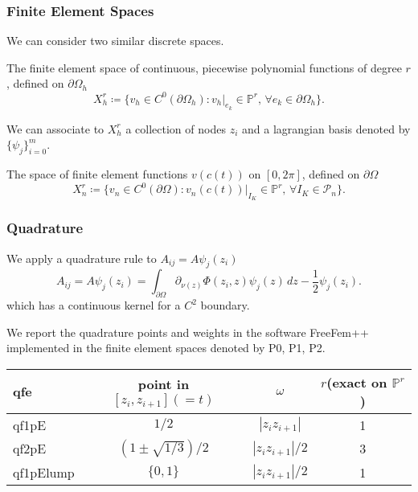 \documentclass[handout]{beamer}
\begin{document}
\begin{frame}
\frametitle{Finite Element Spaces}
We can consider two similar discrete spaces.
\begin{definition}
The finite element space of continuous, piecewise polynomial functions of degree $r$, 
defined on {\color{blue}$\partial\Omega_h$}
\begin{equation}
 X^r_h \coloneqq \{v_h\in C^0(\partial\Omega_h):v_h|_{e_k} \in \mathbb{P}^r,\, \forall e_k\in \partial\Omega_h\}.
\end{equation}
\end{definition}
We can associate to $X^r_h$ a collection of {\color{blue}nodes} $z_i$ and 
a {\color{blue}lagrangian basis}
denoted by $\{\psi_j\}_{i=0}^m$.
\begin{definition}
The space of finite element functions $v(c(t))$ on $[0,2\pi]$, 
defined on {\color{blue}$\partial\Omega$}
\begin{equation}
 X^r_n \coloneqq \{v_n\in C^0(\partial\Omega):v_n(c(t))|_{I_K} \in \mathbb{P}^r,\, \forall I_K\in \mathcal{P}_n\}.
\end{equation}
\end{definition}
\end{frame}
\begin{frame}
 \frametitle{Quadrature}
We apply a quadrature rule to $A_{ij} = A\psi_j(z_i)$
\begin{equation}
 A_{ij} = A\psi_j(z_i) = \int_{\partial\Omega}\partial_{\nu(z)}\Phi(z_i, z)\psi_j(z)\,dz  - \frac{1}{2}\psi_j(z_i).
\end{equation}
which has a continuous kernel for a $C^2$ boundary.
\pause
\par
We report the quadrature points and weights in the software
FreeFem++ implemented in the finite element spaces
denoted by P0, P1, P2.
\begin{center}
\begin{tabular}{lccc}
\toprule
 qfe & point in $[z_i, z_{i+1}](=t)$ & 
 $\omega$ & $r$(exact on $\mathbb{P}^r$)\\
\midrule
qf1pE & $1/2$ &  $|z_iz_{i+1}|$ & 1\\
qf2pE & $(1\pm\sqrt{1/3})/2$ &  $|z_iz_{i+1}|/2$ & 3\\
qf1pElump & $\{0, 1\}$ & $|z_iz_{i+1}|/2$ & 1\\
\bottomrule
\end{tabular}
\end{center}
\end{frame}
\end{document}

